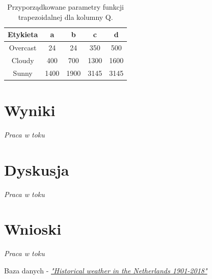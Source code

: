 \documentclass{classrep}
\begin{document}
\begin{table}[H]
	\centering
	\begin{tabular}{c c c c c} 
		\hline
		\textbf{Etykieta} & \textbf{a} & \textbf{b} & \textbf{c} & \textbf{d}\\ [0.5ex] 
		\hline
		\hline 
Overcast	 & 24 & 24 & 350 & 500 \\
Cloudy & 400 & 700 & 1300 & 1600 \\
Sunny	 & 1400 & 1900 & 3145 & 3145 \\
		\hline
	\end{tabular}
	\caption{Przyporządkowane parametry funkcji trapezoidalnej dla kolumny Q.}
\end{table}




\section{Wyniki}
\textit{Praca w toku}


\section{Dyskusja}
\textit{Praca w toku}


\section{Wnioski}
\textit{Praca w toku}


\begin{thebibliography}{1}
Baza danych - 
\href{https://www.kaggle.com/sinaasappel/historical-weather-in-the-netherlands-19012018}{\textit{"Historical weather in the Netherlands 1901-2018"}}
\end{thebibliography}
\end{document}
